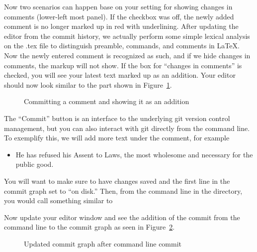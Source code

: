 Now two scenarios can happen base on your setting for showing changes in comments (lower-left most panel).  If the checkbox was off, the newly added comment is no longer marked up in red with underlining.  After updating the editor from the commit history, we actually perform some simple lexical analysis on the .tex file to distinguish preamble, commands, and comments in LaTeX.  Now the newly entered comment is recognized as such, and if we hide changes in comments, the markup will not show.  If the box for ``changes in comments'' is checked, you will see your latest text marked up as an addition.  Your editor should now look similar to the part shown in Figure~\ref{fig:commit-comment}.
\begin{figure}[t]
\centering
{}
\caption{Committing a comment and showing it as an addition} \label{fig:commit-comment}
\end{figure}

The ``Commit'' button is an interface to the underlying git version control management, but you can also interact with git directly from the command line.  To exemplify this, we will add more text under the comment, for example

\begin{CodeVerbatim}
\begin{itemize}
  \item He has refused his Assent to Laws, the most wholesome and necessary 
        for the public good.
\end{itemize}
\end{CodeVerbatim}
    
You will want to make sure to have changes saved and the first line in the commit graph set to ``on disk.''  Then, from the command line in the  directory, you would call something similar to
Now update your editor window and see the addition of the commit from the command line to the commit graph as seen in Figure~\ref{fig:commit-cmd-line}.
\begin{figure}[t]
\centering
{}
\caption{Updated commit graph after command line commit} \label{fig:commit-cmd-line}
\end{figure}

